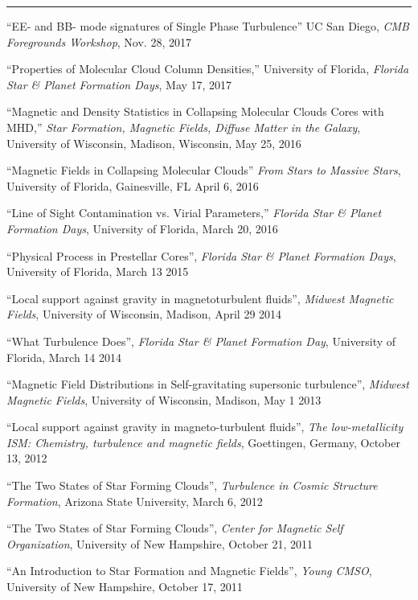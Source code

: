 
\rule[3pt]{337pt}{.1mm}

\medskip
\noindent
``EE- and BB- mode signatures of Single Phase Turbulence'' UC San Diego, {\it
CMB Foregrounds Workshop}, Nov. 28, 2017


\medskip
\noindent
``Properties of Molecular Cloud Column Densities,'' University of Florida, {\it
Florida Star \& Planet Formation Days}, May 17, 2017


\medskip
\noindent
``Magnetic and Density Statistics in Collapsing Molecular Clouds Cores with
MHD,'' {\it Star Formation, Magnetic Fields, Diffuse Matter in the Galaxy}, University
of Wisconsin, Madison,
Wisconsin, May 25, 2016

\medskip
\noindent
``Magnetic Fields in Collapsing Molecular Clouds'' {\it From Stars to Massive
Stars},
University of Florida, Gainesville, FL April 6, 2016

\medskip
\noindent
``Line of Sight Contamination vs.  Virial Parameters,'' 
{\it Florida Star \& Planet Formation Days}, University of Florida, March 20,
2016

\medskip
\noindent
``Physical Process in Prestellar Cores'',
{\it Florida Star \& Planet Formation Days}, University of Florida, 
March 13 2015

\medskip
\noindent
``Local support against gravity in magnetoturbulent fluids'',
{\it Midwest Magnetic Fields}, University of Wisconsin, Madison,  April 29 2014


\medskip
\noindent
``What Turbulence Does'',
{\it Florida Star \& Planet Formation Day}, University of Florida,  March 14
2014

\medskip
\noindent
``Magnetic Field Distributions in Self-gravitating supersonic turbulence'',
{\it Midwest Magnetic Fields}, University of Wisconsin, Madison,  May 1 2013

\medskip
\noindent
``Local support against gravity in magneto-turbulent fluids'', {\it The
low-metallicity ISM: Chemistry, turbulence and magnetic fields}, Goettingen,
Germany, October 13, 2012


\medskip
\noindent
``The Two States of Star Forming Clouds'',  {\it Turbulence in Cosmic
Structure Formation}, Arizona State University, March 6, 2012

\medskip
\noindent
``The Two States of Star Forming Clouds'',  {\it Center for Magnetic Self
Organization}, University of New Hampshire, October 21, 2011

\medskip
\noindent
``An Introduction to Star Formation and Magnetic Fields'',  {\it
Young CMSO}, University of New Hampshire, October 17, 2011

